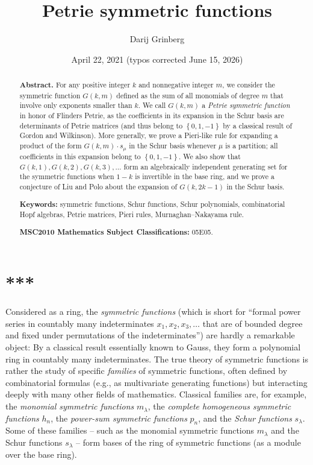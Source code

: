 \documentclass[numbers=enddot,12pt,final,onecolumn,notitlepage]{scrartcl}%
\theoremstyle{definition}
\begin{document}
\title{Petrie symmetric functions}
\author{Darij Grinberg}
\date{April 22, 2021 (typos corrected June 15, 2026)}
\maketitle

\begin{abstract}
\textbf{Abstract.} For any positive integer $k$ and nonnegative integer $m$,
we consider the symmetric function $G\left(  k,m\right)  $ defined as the sum
of all monomials of degree $m$ that involve only exponents smaller than $k$.
We call $G\left(  k,m\right)  $ a \textit{Petrie symmetric function} in honor
of Flinders Petrie, as the coefficients in its expansion in the Schur basis
are determinants of Petrie matrices (and thus belong to $\left\{
0,1,-1\right\}  $ by a classical result of Gordon and Wilkinson). More
generally, we prove a Pieri-like rule for expanding a product of the form
$G\left(  k,m\right)  \cdot s_{\mu}$ in the Schur basis whenever $\mu$ is a
partition; all coefficients in this expansion belong to $\left\{
0,1,-1\right\}  $. We also show that $G\left(  k,1\right)  ,G\left(
k,2\right)  ,G\left(  k,3\right)  ,\ldots$ form an algebraically independent
generating set for the symmetric functions when $1-k$ is invertible in the
base ring, and we prove a conjecture of Liu and Polo about the expansion of
$G\left(  k,2k-1\right)  $ in the Schur basis.

\textbf{Keywords:} symmetric functions, Schur functions, Schur polynomials,
combinatorial Hopf algebras, Petrie matrices, Pieri rules, Murnaghan--Nakayama rule.

\textbf{MSC2010 Mathematics Subject Classifications:} 05E05.

\end{abstract}
\tableofcontents

\section*{***}

Considered as a ring, the \textit{symmetric functions} (which is short for
\textquotedblleft formal power series in countably many indeterminates
$x_{1},x_{2},x_{3},\ldots$ that are of bounded degree and fixed under
permutations of the indeterminates\textquotedblright) are hardly a remarkable
object: By a classical result essentially known to Gauss, they form a
polynomial ring in countably many indeterminates. The true theory of symmetric
functions is rather the study of specific \textit{families} of symmetric
functions, often defined by combinatorial formulas (e.g., as multivariate
generating functions) but interacting deeply with many other fields of
mathematics. Classical families are, for example, the \textit{monomial
symmetric functions} $m_{\lambda}$, the \textit{complete homogeneous symmetric
functions }$h_{n}$, the \textit{power-sum symmetric functions} $p_{n}$, and
the \textit{Schur functions }$s_{\lambda}$. Some of these families -- such as
the monomial symmetric functions $m_{\lambda}$ and the Schur functions
$s_{\lambda}$ -- form bases of the ring of symmetric functions (as a module
over the base ring).
\end{document}
